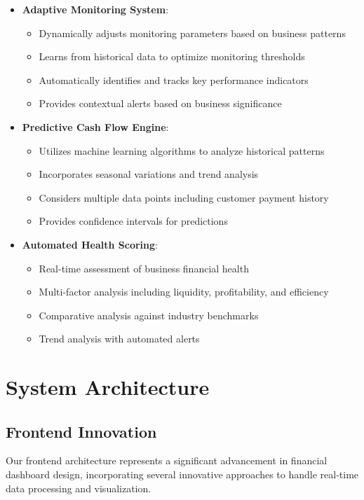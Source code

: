 \documentclass[conference]{IEEEtran}
\begin{document}
\begin{itemize}
\item \textbf{Adaptive Monitoring System}: 
    \begin{itemize}
    \item Dynamically adjusts monitoring parameters based on business patterns
    \item Learns from historical data to optimize monitoring thresholds
    \item Automatically identifies and tracks key performance indicators
    \item Provides contextual alerts based on business significance
    \end{itemize}

\item \textbf{Predictive Cash Flow Engine}: 
    \begin{itemize}
    \item Utilizes machine learning algorithms to analyze historical patterns
    \item Incorporates seasonal variations and trend analysis
    \item Considers multiple data points including customer payment history
    \item Provides confidence intervals for predictions
    \end{itemize}

\item \textbf{Automated Health Scoring}: 
    \begin{itemize}
    \item Real-time assessment of business financial health
    \item Multi-factor analysis including liquidity, profitability, and efficiency
    \item Comparative analysis against industry benchmarks
    \item Trend analysis with automated alerts
    \end{itemize}
\end{itemize}

\section{System Architecture}
\subsection{Frontend Innovation}
Our frontend architecture represents a significant advancement in financial dashboard design, incorporating several innovative approaches to handle real-time data processing and visualization.
\end{document}
